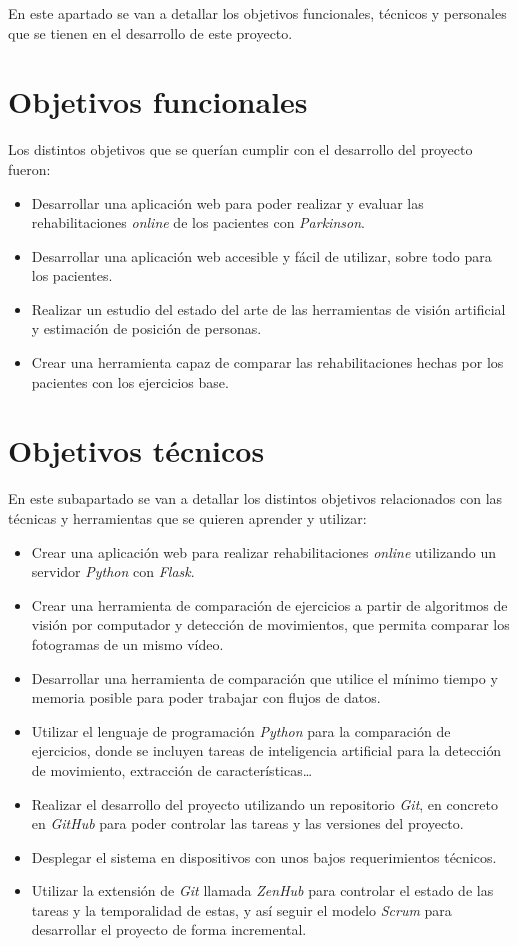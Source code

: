
En este apartado se van a detallar los objetivos funcionales, técnicos y personales que se tienen en el desarrollo de este proyecto.

\section{Objetivos funcionales}
Los distintos objetivos que se querían cumplir con el desarrollo del proyecto fueron:
\begin{itemize}
	\item Desarrollar una aplicación web para poder realizar y evaluar las rehabilitaciones \textit{online} de los pacientes con \textit{Parkinson}.
	\item Desarrollar una aplicación web accesible y fácil de utilizar, sobre todo para los pacientes.
	\item Realizar un estudio del estado del arte de las herramientas de visión artificial y estimación de posición de personas.
	\item Crear una herramienta capaz de comparar las rehabilitaciones hechas por los pacientes con los ejercicios base.
\end{itemize}

\section{Objetivos técnicos}
En este subapartado se van a detallar los distintos objetivos relacionados con las técnicas y herramientas que se quieren aprender y utilizar:
\begin{itemize}
	\item Crear una aplicación web para realizar rehabilitaciones \textit{online} utilizando un servidor \textit{Python} con \textit{Flask}.
	\item Crear una herramienta de comparación de ejercicios a partir de algoritmos de visión por computador y detección de movimientos, que permita comparar los fotogramas de un mismo vídeo.
	\item Desarrollar una herramienta de comparación que utilice el mínimo tiempo y memoria posible para poder trabajar con flujos de datos.
	\item Utilizar el lenguaje de programación \textit{Python} para la comparación de ejercicios, donde se incluyen tareas de inteligencia artificial para la detección de movimiento, extracción de características\ldots
	\item Realizar el desarrollo del proyecto utilizando un repositorio \textit{Git}, en concreto en \textit{GitHub} para poder controlar las tareas y las versiones del proyecto.
	\item Desplegar el sistema en dispositivos con unos bajos requerimientos técnicos.
	\item Utilizar la extensión de \textit{Git} llamada \textit{ZenHub} para controlar el estado de las tareas y la temporalidad de estas, y así seguir el modelo \textit{Scrum} para desarrollar el proyecto de forma incremental.
\end{itemize}

